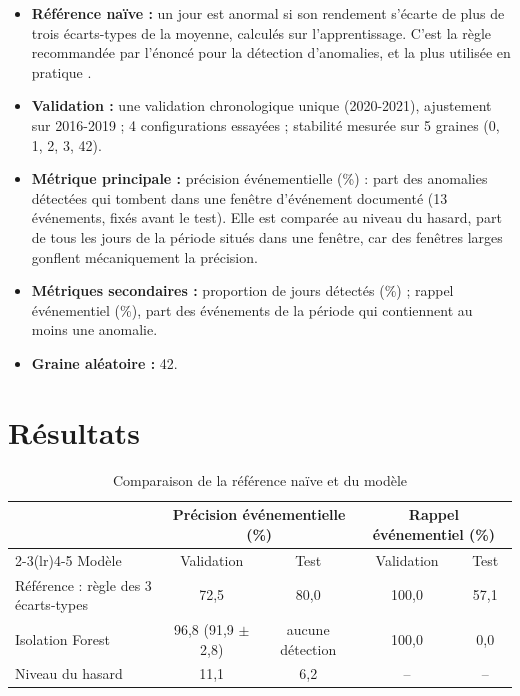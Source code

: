 \documentclass[11pt,a4paper]{article}
\begin{document}
\begin{itemize}
  \item \textbf{Référence naïve :} un jour est anormal si son rendement s'écarte de plus de trois écarts-types de la moyenne, calculés sur l'apprentissage. C'est la règle recommandée par l'énoncé pour la détection d'anomalies, et la plus utilisée en pratique \cite{chandola}.
  \item \textbf{Validation :} une validation chronologique unique (2020-2021), ajustement sur 2016-2019 ; 4 configurations essayées ; stabilité mesurée sur 5 graines (0, 1, 2, 3, 42).
  \item \textbf{Métrique principale :} précision événementielle (\%) : part des anomalies détectées qui tombent dans une fenêtre d'événement documenté (13 événements, fixés avant le test). Elle est comparée au niveau du hasard, part de tous les jours de la période situés dans une fenêtre, car des fenêtres larges gonflent mécaniquement la précision.
  \item \textbf{Métriques secondaires :} proportion de jours détectés (\%) ; rappel événementiel (\%), part des événements de la période qui contiennent au moins une anomalie.
  \item \textbf{Graine aléatoire :} 42.
\end{itemize}

\section{Résultats}
\label{sec:resultats}
\begin{table}[htbp]
  \centering
  \caption{Comparaison de la référence naïve et du modèle}
  \label{tab:resultats}
  \small
  \begin{tabular}{@{}l cc cc@{}}
    \toprule
    & \multicolumn{2}{c}{Précision événementielle (\%)} & \multicolumn{2}{c}{Rappel événementiel (\%)} \\
    \cmidrule(lr){2-3}\cmidrule(lr){4-5}
    Modèle & Validation & Test & Validation & Test \\
    \midrule
    Référence : règle des 3 écarts-types & 72,5 & 80,0 & 100,0 & 57,1 \\
    Isolation Forest & 96,8 (91,9 $\pm$ 2,8) & aucune détection & 100,0 & 0,0 \\
    \midrule
    Niveau du hasard & 11,1 & 6,2 & -- & -- \\
    \bottomrule
  \end{tabular}
\end{table}
\end{document}
